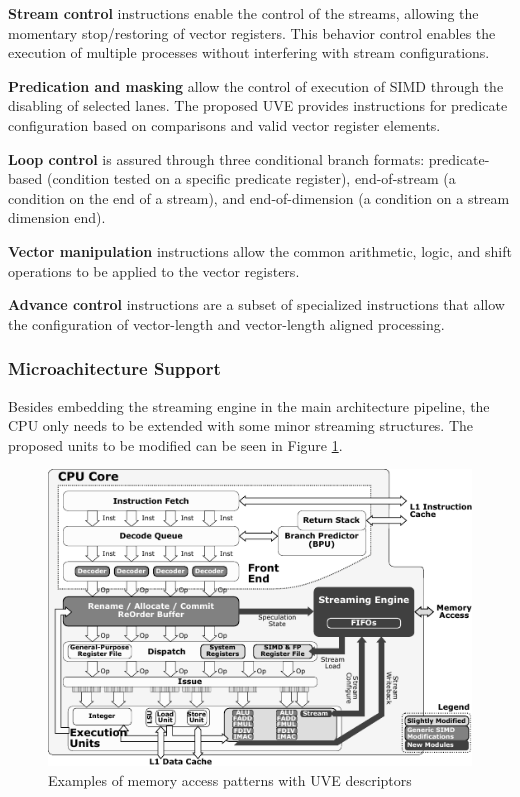 \textbf{Stream control} instructions enable the control of the streams, allowing the momentary stop/restoring of vector registers. This behavior control enables the execution of multiple processes without interfering with stream configurations. 

\textbf{Predication and masking} allow the control of execution of SIMD through the disabling of selected lanes. The proposed UVE provides instructions for predicate configuration based on comparisons and valid vector register elements.

\textbf{Loop control} is assured through three conditional branch formats: predicate-based (condition tested on a specific predicate register), end-of-stream (a condition on the end of a stream), and end-of-dimension (a condition on a stream dimension end).

\textbf{Vector manipulation} instructions allow the common arithmetic, logic, and shift operations to be applied to the vector registers.

\textbf{Advance control} instructions are a subset of specialized instructions that allow the configuration of vector-length and vector-length aligned processing.


\subsubsection{Microachitecture Support}

Besides embedding the streaming engine in the main architecture pipeline, the CPU only needs to be extended with some minor streaming structures. The proposed units to be modified can be seen in Figure \ref{fig:uve-arch}. 

\begin{figure}[H]
	\begin{center}
 		\includegraphics[width=0.77\linewidth]{images/UVE-arch.pdf}
 		\caption{Examples of memory access patterns with UVE descriptors }
 		\label{fig:uve-arch}
	\end{center} 
\end{figure}


